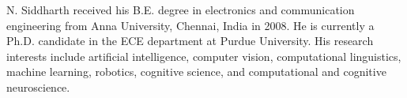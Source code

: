 \begin{vita}
  N. Siddharth received his B.E. degree in electronics and communication
  engineering from Anna University, Chennai, India in 2008.
  He is currently a Ph.D. candidate in the ECE department at Purdue
  University.
  His research interests include artificial intelligence, computer vision,
  computational linguistics, machine learning, robotics, cognitive science, and
  computational and cognitive neuroscience.
\end{vita}

